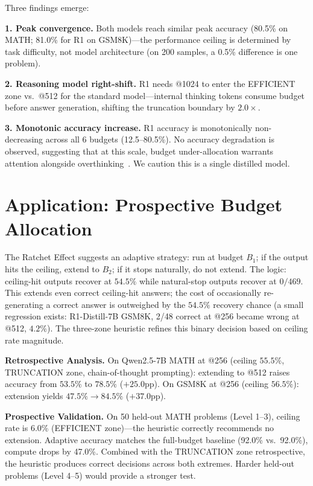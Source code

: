 \documentclass{article}
\begin{document}
Three findings emerge:

\textbf{1. Peak convergence.} Both models reach similar peak accuracy (80.5\% on MATH; 81.0\% for R1 on GSM8K)---the performance ceiling is determined by task difficulty, not model architecture (on 200 samples, a 0.5\% difference is one problem).

\textbf{2. Reasoning model right-shift.} R1 needs @1024 to enter the EFFICIENT zone vs.\ @512 for the standard model---internal thinking tokens consume budget before answer generation, shifting the truncation boundary by $2.0\times$.

\textbf{3. Monotonic accuracy increase.} R1 accuracy is monotonically non-decreasing across all 6 budgets (12.5--80.5\%). No accuracy degradation is observed, suggesting that at this scale, budget under-allocation warrants attention alongside overthinking~\cite{chen2024overthinking}. We caution this is a single distilled model.

\section{Application: Prospective Budget Allocation}

The Ratchet Effect suggests an adaptive strategy: run at budget $B_1$; if the output hits the ceiling, extend to $B_2$; if it stops naturally, do not extend. The logic: ceiling-hit outputs recover at $54.5\%$ while natural-stop outputs recover at $0/469$. This extends even correct ceiling-hit answers; the cost of occasionally re-generating a correct answer is outweighed by the $54.5\%$ recovery chance (a small regression exists: R1-Distill-7B GSM8K, 2/48 correct at @256 became wrong at @512, $4.2\%$). The three-zone heuristic refines this binary decision based on ceiling rate magnitude.

\textbf{Retrospective Analysis.}
On Qwen2.5-7B MATH at @256 (ceiling $55.5\%$, TRUNCATION zone, chain-of-thought prompting): extending to @512 raises accuracy from $53.5\%$ to $78.5\%$ ($+25.0$pp). On GSM8K at @256 (ceiling $56.5\%$): extension yields $47.5\% \to 84.5\%$ ($+37.0$pp).

\textbf{Prospective Validation.}
On 50 held-out MATH problems (Level 1--3), ceiling rate is 6.0\% (EFFICIENT zone)---the heuristic correctly recommends no extension. Adaptive accuracy matches the full-budget baseline (92.0\% vs.\ 92.0\%), compute drops by 47.0\%. Combined with the TRUNCATION zone retrospective, the heuristic produces correct decisions across both extremes. Harder held-out problems (Level 4--5) would provide a stronger test.
\end{document}

